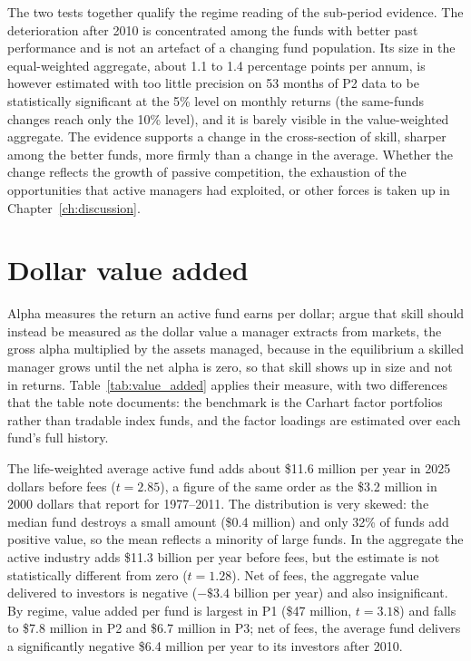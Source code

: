 \documentclass[12pt, oneside]{report}
\begin{document}


The two tests together qualify the regime reading of the sub-period
evidence. The deterioration after 2010 is concentrated among the funds
with better past performance and is not an artefact of a changing fund
population. Its size in the equal-weighted aggregate, about 1.1 to 1.4
percentage points per annum, is however estimated with too little
precision on 53 months of P2 data to be statistically significant at
the 5\% level on monthly returns (the same-funds changes reach only the
10\% level), and it is barely visible in the
value-weighted aggregate. The evidence supports a change in the
cross-section of skill, sharper among the better funds, more firmly than
a change in the average. Whether the change reflects the growth of
passive competition, the exhaustion of the opportunities that active
managers had exploited, or other forces is taken up in
Chapter~\ref{ch:discussion}.

\section{Dollar value added}
\label{sec:value_added}

\noindent Alpha measures the return an active fund earns per dollar;
\textcite{BerkVanBinsbergen2015} argue that skill should instead be
measured as the dollar value a manager extracts from markets, the gross
alpha multiplied by the assets managed, because in the
\textcite{BerkGreen2004} equilibrium a skilled manager grows until the
net alpha is zero, so that skill shows up in size and not in returns.
Table~\ref{tab:value_added} applies their measure, with two differences
that the table note documents: the benchmark is the Carhart factor
portfolios rather than tradable index funds, and the factor loadings are
estimated over each fund's full history.



The life-weighted average active fund adds about \$11.6 million per year
in 2025 dollars before fees ($t = 2.85$), a figure of the same order as
the \$3.2 million in 2000 dollars that \textcite{BerkVanBinsbergen2015}
report for 1977--2011. The distribution is very skewed: the median fund
destroys a small amount (\$0.4 million) and only 32\% of funds add
positive value, so the mean reflects a minority of large funds. In the
aggregate the active industry adds \$11.3 billion per year before fees,
but the estimate is not statistically different from zero ($t = 1.28$).
Net of fees, the aggregate value delivered to investors is negative
($-\$3.4$ billion per year) and also insignificant. By regime, value
added per fund is largest in P1 (\$47 million, $t = 3.18$) and falls to
\$7.8 million in P2 and \$6.7 million in P3; net of fees, the average fund
delivers a significantly negative \$6.4 million per year to its
investors after 2010.
\end{document}

